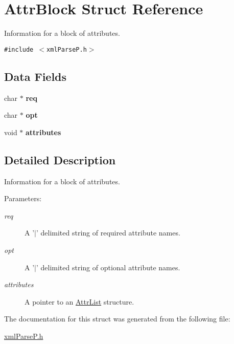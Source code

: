 \hypertarget{structAttrBlock}{
\section{AttrBlock Struct Reference}
\label{structAttrBlock}
}
Information for a block of attributes.  


{\tt \#include $<$xmlParseP.h$>$}

\subsection*{Data Fields}
\begin{CompactItemize}
\item 
\hypertarget{structAttrBlock_fa9326ebb9e46e6f599d80f67db42cb6}{
char $\ast$ \textbf{req}}
\label{structAttrBlock_fa9326ebb9e46e6f599d80f67db42cb6}

\item 
\hypertarget{structAttrBlock_c96c734b9124fcdba0ebbb5f8703c940}{
char $\ast$ \textbf{opt}}
\label{structAttrBlock_c96c734b9124fcdba0ebbb5f8703c940}

\item 
\hypertarget{structAttrBlock_6d23c0d081bb527c934e99f47b10c461}{
void $\ast$ \textbf{attributes}}
\label{structAttrBlock_6d23c0d081bb527c934e99f47b10c461}

\end{CompactItemize}


\subsection{Detailed Description}
Information for a block of attributes. 

\begin{Desc}
\item[Parameters:]
\begin{description}
\item[{\em req}]A '$|$' delimited string of required attribute names. \item[{\em opt}]A '$|$' delimited string of optional attribute names. \item[{\em attributes}]A pointer to an \hyperlink{structAttrList}{AttrList} structure. \end{description}
\end{Desc}


The documentation for this struct was generated from the following file:\begin{CompactItemize}
\item 
\hyperlink{xmlParseP_8h}{xmlParseP.h}\end{CompactItemize}
